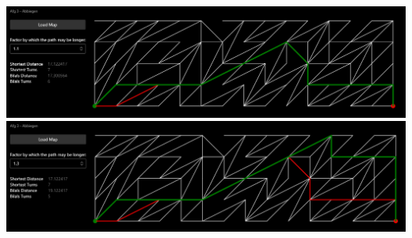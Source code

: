 \documentclass{article}
\theoremstyle{nonumberplain}
\begin{document}
\subsection{}

\begin{center}
\includegraphics[width=\textwidth]{examples/1_10.png}
\includegraphics[width=\textwidth]{examples/1_30.png}
\end{center}

\subsection{}
\end{document}
